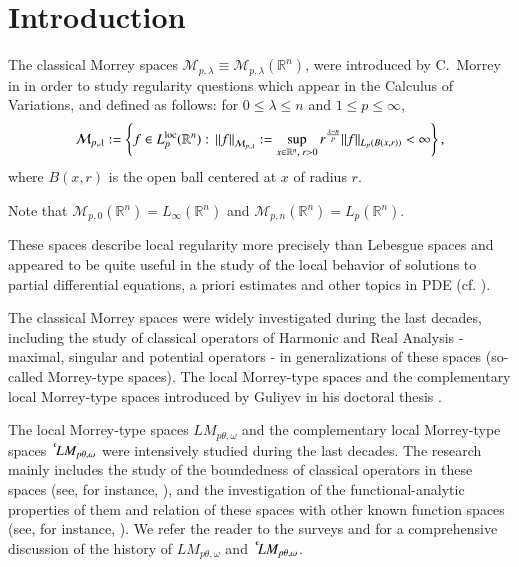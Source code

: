 \documentclass[11pt]{amsart}
\theoremstyle{plain}
\theoremstyle{definition}
\numberwithin{thm}{section}
\numberwithin{equation}{section}
\begin{document}
\maketitle

\section{Introduction}\label{introduction}

The classical Morrey spaces $\mathcal{M}_{p, \lambda} \equiv \mathcal{M}_{p, \lambda} ({{\mathbb R}^n})$,
were  introduced by C.~Morrey in \cite{M1938} in order to study regularity questions which appear in the Calculus of Variations,
and defined as follows:  for $0 \le \lambda \le n$ and $1\le p \le \infty$,
$$
\mathcal{M}_{p,\lambda} : = \left\{ f \in   {L_p^{\rm loc}({{\mathbb R}^n})}:\,\left\| f\right\|_{\mathcal{M}_{p,\lambda }} : =
\sup_{x\in {{\mathbb R}^n}, \; r>0 }
r^{\frac{\lambda-n}{p}} \|f\|_{L_{p}(B(x,r))} <\infty\right\},
$$
where ${{B(x,r)}}$ is the open ball centered at $x$ of radius $r$.

Note that $\mathcal{M}_{p,0}({{\mathbb R}^n}) = L_{\infty}({{\mathbb R}^n})$ and ${\mathcal M}_{p,n}({{\mathbb R}^n}) = L_{p}({{\mathbb R}^n})$.

These spaces describe local regularity more precisely than Lebesgue spaces and appeared to be quite useful in the study of the local
behavior of solutions to partial differential equations, a priori estimates and other topics in PDE (cf. \cite{giltrud}).    

The classical Morrey spaces were widely investigated during the last decades, including the study of classical operators of Harmonic and Real Analysis - maximal, singular and potential operators - in generalizations of these spaces (so-called Morrey-type spaces). The local Morrey-type spaces and the complementary local Morrey-type spaces introduced by Guliyev in his doctoral thesis \cite{GulDoc}. 

The local Morrey-type spaces ${LM_{p{\theta},{\omega}}}$ and the complementary local Morrey-type spaces ${\,^{^{\bf c}}\!} {LM_{p{\theta},{\omega}}}$ were intensively studied during the last decades. The research mainly includes the study of the boundedness of classical operators in these spaces (see, for instance, \cite{Bur1,Bur2,BurGol,BurHus1,BurGulHus2,BurGulHus1,BurGulSerTar,BGGM,BGGM1}), and the
investigation of the functional-analytic properties of them and relation of these spaces with other known
function spaces (see, for instance, \cites{BurNur,batsaw,mu_emb}). We refer the reader to the surveys \cite{Bur1}
and \cite{Bur2} for a comprehensive discussion of the history of ${LM_{p{\theta},{\omega}}}$ and ${\,^{^{\bf c}}\!} {LM_{p{\theta},{\omega}}}$. 
\end{document}
